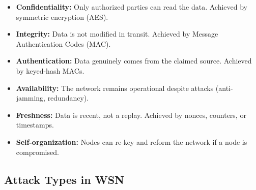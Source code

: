 \documentclass[12pt,a4paper]{article}
\begin{document}
\begin{tcolorbox}[examplebox, title={\textbf{Security Goals in WSN}}]
\begin{itemize}[leftmargin=*, itemsep=4pt]
  \item \textbf{Confidentiality:} Only authorized parties can read the data. Achieved by symmetric encryption (AES).
  \item \textbf{Integrity:} Data is not modified in transit. Achieved by Message Authentication Codes (MAC).
  \item \textbf{Authentication:} Data genuinely comes from the claimed source. Achieved by keyed-hash MACs.
  \item \textbf{Availability:} The network remains operational despite attacks (anti-jamming, redundancy).
  \item \textbf{Freshness:} Data is recent, not a replay. Achieved by nonces, counters, or timestamps.
  \item \textbf{Self-organization:} Nodes can re-key and reform the network if a node is compromised.
\end{itemize}
\end{tcolorbox}

\subsection{Attack Types in WSN}
\end{document}
